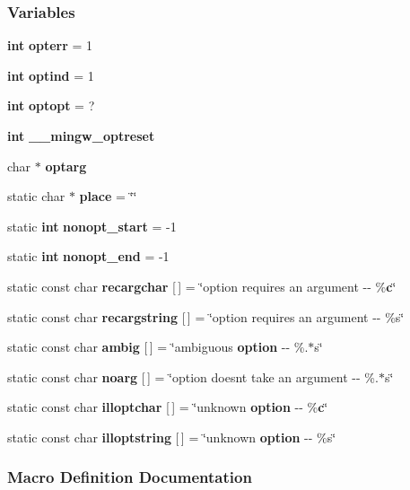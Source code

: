 \subsubsection*{Variables}
\begin{DoxyCompactItemize}
\item 
{\bf int} {\bf opterr} = 1
\item 
{\bf int} {\bf optind} = 1
\item 
{\bf int} {\bf optopt} = \textquotesingle{}?\textquotesingle{}
\item 
{\bf int} {\bf \+\_\+\+\_\+mingw\+\_\+optreset}
\item 
char $\ast$ {\bf optarg}
\item 
static char $\ast$ {\bf place} = \char`\"{}\char`\"{}
\item 
static {\bf int} {\bf nonopt\+\_\+start} = -\/1
\item 
static {\bf int} {\bf nonopt\+\_\+end} = -\/1
\item 
static const char {\bf recargchar} [$\,$] = \char`\"{}option requires an argument -\/-\/ \%{\bf c}\char`\"{}
\item 
static const char {\bf recargstring} [$\,$] = \char`\"{}option requires an argument -\/-\/ \%s\char`\"{}
\item 
static const char {\bf ambig} [$\,$] = \char`\"{}ambiguous {\bf option} -\/-\/ \%.$\ast$s\char`\"{}
\item 
static const char {\bf noarg} [$\,$] = \char`\"{}option doesn\textquotesingle{}t take an argument -\/-\/ \%.$\ast$s\char`\"{}
\item 
static const char {\bf illoptchar} [$\,$] = \char`\"{}unknown {\bf option} -\/-\/ \%{\bf c}\char`\"{}
\item 
static const char {\bf illoptstring} [$\,$] = \char`\"{}unknown {\bf option} -\/-\/ \%s\char`\"{}
\end{DoxyCompactItemize}


\subsubsection{Macro Definition Documentation}
